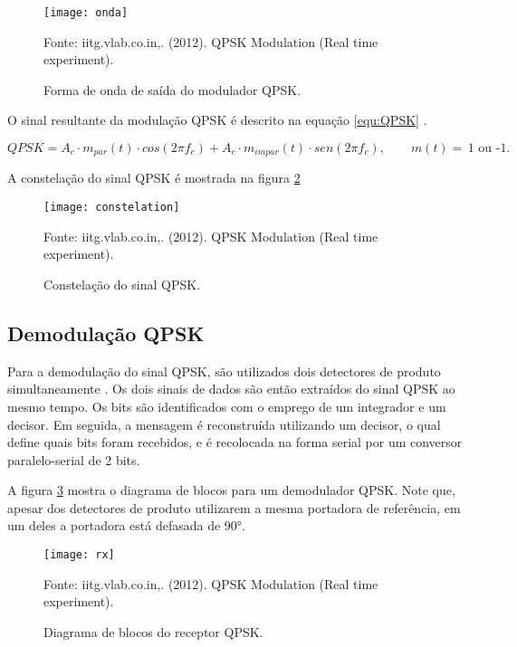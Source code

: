 \begin{figure}[H]
  \centering
  \caption{Forma de onda de saída do modulador QPSK.}
  \texttt{[image: onda]}
  
  \small Fonte: iitg.vlab.co.in,. (2012). QPSK Modulation (Real time experiment).
  \label{fig:onda}
\end{figure}


O sinal resultante da modulação QPSK é descrito na equação \ref{equ:QPSK} \cite{Stallings}.

\begin{equation}
  \label{equ:QPSK}
  QPSK = A_c\cdot m_{par}(t) \cdot cos \left(2\pi f_c\right) + A_c\cdot m_{impar}(t) \cdot sen \left(2\pi f_c\right), \qquad m(t) = \, \mbox{1 ou -1.}
\end{equation}

A constelação do sinal QPSK é mostrada na figura \ref{fig:constelation}

\begin{figure}[H]
  \centering
  \caption{Constelação do sinal QPSK.}
  \texttt{[image: constelation]}
  
  \small Fonte: iitg.vlab.co.in,. (2012). QPSK Modulation (Real time experiment).
  \label{fig:constelation}
\end{figure}
                  

\subsection{Demodulação QPSK}

Para a demodulação do sinal QPSK, são utilizados dois detectores de produto simultaneamente \cite{Medeiros}. Os dois sinais de dados são então extraídos do sinal QPSK ao mesmo tempo. Os bits são identificados com o emprego de um integrador e um decisor. Em seguida, a mensagem é reconstruída utilizando um decisor, o qual define quais bits foram recebidos, e é recolocada na forma serial por um conversor paralelo-serial de 2 bits.

A figura \ref{fig:rx} mostra o diagrama de blocos para um demodulador QPSK. Note que, apesar dos detectores de produto utilizarem a mesma portadora de referência, em um deles a portadora está defasada de 90°.

\begin{figure}[H]
  \centering
  \caption{Diagrama de blocos do receptor QPSK.}
  \texttt{[image: rx]}
  
  \small Fonte: iitg.vlab.co.in,. (2012). QPSK Modulation (Real time experiment).
  \label{fig:rx}
\end{figure}

